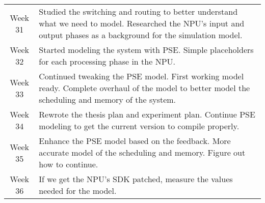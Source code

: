 \begin{center}
\begin{longtable}{@{}c|p{10cm}@{}}
    Week 31 & Studied the switching and routing to better understand what we need to model. Researched the NPU's input and output phases as a background for the simulation model. \\
    Week 32 & Started modeling the system with PSE. Simple placeholders for each processing phase in the NPU. \\
    Week 33 & Continued tweaking the PSE model. First working model ready. Complete overhaul of the model to better model the scheduling and memory of the system. \\
    \toprule
    Week 34 & Rewrote the thesis plan and experiment plan. Continue PSE modeling to get the current version to compile properly. \\
    Week 35 & Enhance the PSE model based on the feedback. More accurate model of the scheduling and memory. Figure out how to continue. \\
    Week 36 & If we get the NPU's SDK patched, measure the values needed for the model. \\

    \bottomrule

  \end{longtable}
\end{center}

